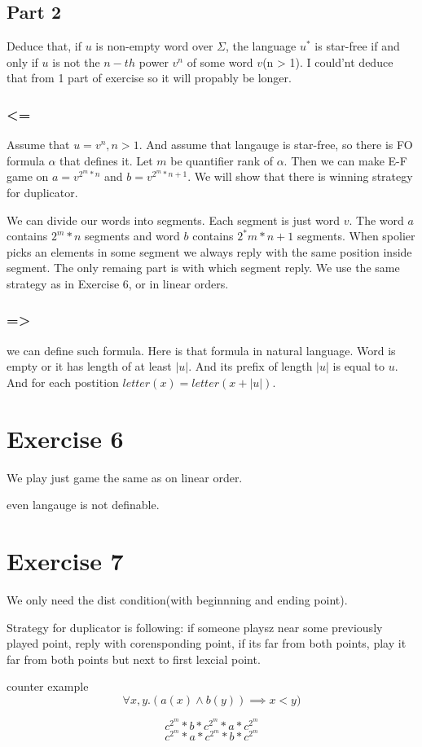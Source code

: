 \documentclass{article}
\begin{document}
\subsection{Part 2}
Deduce that, if $u$ is non-empty word over $\Sigma$, the language $u^*$ is star-free if and only if $u$ is not the $n-th$ power $v^n$ of some word $v$(n > 1). I could'nt deduce that from 1 part of exercise so it will propably be longer.

\subsubsection{<=}
Assume that $u = v^n, n > 1$. And assume that langauge is star-free, so there is FO formula $\alpha$ that defines it. Let $m$ be quantifier rank of $\alpha$. Then we can make E-F game on $a = v^{2^m * n}$ and $b = v^{2^m * n + 1}$. We will show that there is winning strategy for duplicator.

We can divide our words into segments. Each segment is just word $v$. The word $a$ contains $2^m *n $ segments and word $b$ contains $2^*m * n + 1$ segments. When spolier picks an elements in some segment we always reply with the same position inside segment. The only remaing part is with which segment reply. We use the same strategy as in Exercise 6, or in linear orders.

\subsubsection{=>} we can define such formula. Here is that formula in natural language. Word is empty or it has length of at least $|u|$. And its prefix of length $|u|$ is equal to $u$. And for each postition $letter(x) = letter(x + |u|)$. 
\section*{Exercise 6}
We play just game the same as on linear order.

even langauge is not definable. 

\section{Exercise 7}
We only need the dist condition(with beginnning and ending point).

Strategy for duplicator is following:
if someone playsz near some previously played point, reply with corensponding point, 
if its far from both points, play it far from both points but next to first lexcial point.


counter example
\[\forall x, y. (a(x) \land b(y)) \implies x < y)\]


\[c^{2^m} * b * c^{2^m} * a * c^{2^m}\]
\[c^{2^m} * a * c^{2^m} * b * c^{2^m}\]
\end{document}
